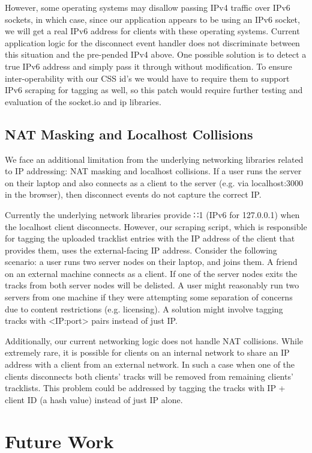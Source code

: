 \documentclass[12pt]{article}
\begin{document}
However, some operating systems may disallow passing IPv4 traffic over IPv6 sockets, in which case, since our application appears to be using an IPv6 socket, we will get a real IPv6 address for clients with these operating systems. Current application logic for the disconnect event handler does not discriminate between this situation and the pre-pended IPv4 above. One possible solution is to detect a true IPv6 address and simply pass it through without modification. To ensure inter-operability with our CSS id's we would have to require them to support IPv6 scraping for tagging as well, so this patch would require further testing and evaluation of the socket.io and ip libraries.

\subsection{NAT Masking and Localhost Collisions}
We face an additional limitation from the underlying networking libraries related to IP addressing: NAT masking and localhost collisions. If a user runs the server on their laptop and also connects as a client to the server (e.g. via localhost:3000 in the browser), then disconnect events do not capture the correct IP.

Currently the underlying network libraries provide ∷1 (IPv6 for 127.0.0.1) when the localhost client disconnects. However, our scraping script, which is responsible for tagging the uploaded tracklist entries with the IP address of the client that provides them, uses the external-facing IP address. Consider the following scenario: a user runs two server nodes on their laptop, and joins them. A friend on an external machine connects as a client. If one of the server nodes exits the tracks from both server nodes will be delisted. A user might reasonably run two servers from one machine if they were attempting some separation of concerns due to content restrictions (e.g. licensing). A solution might involve tagging tracks with <IP:port> pairs instead of just IP.

Additionally, our current networking logic does not handle NAT collisions. While extremely rare, it is possible for clients on an internal network to share an IP address with a client from an external network. In such a case when one of the clients disconnects both clients' tracks will be removed from remaining clients' tracklists. This problem could be addressed by tagging the tracks with IP + client ID (a hash value) instead of just IP alone.

\section{Future Work}
\end{document}
